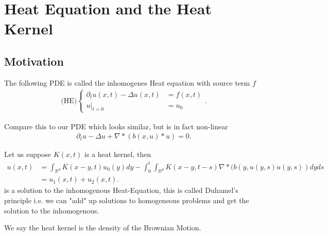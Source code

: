\section{Heat Equation and the Heat Kernel}
\subsection{Motivation}
\begin{definition}\label{HE}
 The following PDE is called the inhomogenes Heat equation with source term $f$ 
 \begin{align*}
   \text{(HE)}\begin{cases}
   \partial_t u(x,t) - \Delta u(x,t) &=f(x,t)\\
   u \rvert_{t=0} &= u_0
 \end{cases} 
 .\end{align*}
\end{definition}
\begin{remark}
 Compare this to our PDE which looks similar, but is in fact non-linear 
\begin{align*}
 \partial_t u - \Delta u + \nabla * (b(x,u)*u) = 0
 .\end{align*}
\end{remark}
\begin{remark}
 Let us suppose $K(x,t)$  is a heat kernel, then 
  \begin{align*}
    u(x,t) &=  \int_{\mathbb{R}^{d} } K(x-y,t) u_0(y) dy - \int_0^{t} \int_{\mathbb{R}^{d} }  K(x-y,t-s) \nabla * (b(y,u(y,s)u(y,s))dy ds \\
           &= u_{1}(x,t) + u_{2}(x,t)
  .\end{align*}
  is a solution to the inhomogenous Heat-Equation, this is called Duhamel's principle i.e. we can "add" up solutions
  to homogeneous problems and get the solution to the inhomogenous.
\end{remark}
\begin{remark}
 We say the heat kernel is the density of the Brownian Motion. 
\end{remark}
